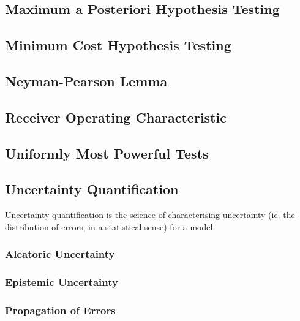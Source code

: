 \documentclass[11pt]{report} %
\begin{document}
\subsection{Maximum a Posteriori Hypothesis Testing}

\subsection{Minimum Cost Hypothesis Testing}

\subsection{Neyman-Pearson Lemma}

\subsection{Receiver Operating Characteristic}

\subsection{Uniformly Most Powerful Tests}

\subsection{Uncertainty Quantification}

Uncertainty quantification is the science of characterising uncertainty (ie. the distribution of errors, in a statistical sense) for a model.

\subsubsection{Aleatoric Uncertainty}

\subsubsection{Epistemic Uncertainty}

\subsubsection{Propagation of Errors}
\end{document}
